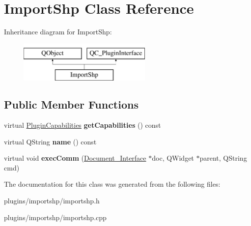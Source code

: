 \hypertarget{classImportShp}{\section{Import\-Shp Class Reference}
\label{classImportShp}
}
Inheritance diagram for Import\-Shp\-:\begin{figure}[H]
\begin{center}
\leavevmode
\includegraphics[height=2.000000cm]{classImportShp}
\end{center}
\end{figure}
\subsection*{Public Member Functions}
\begin{DoxyCompactItemize}
\item 
\hypertarget{classImportShp_ad975c3a17504764740128cd878c13ea3}{virtual \hyperlink{classPluginCapabilities}{Plugin\-Capabilities} {\bfseries get\-Capabilities} () const }\label{classImportShp_ad975c3a17504764740128cd878c13ea3}

\item 
\hypertarget{classImportShp_a21b6d29bbbcededcdb8bfde95039ec74}{virtual Q\-String {\bfseries name} () const }\label{classImportShp_a21b6d29bbbcededcdb8bfde95039ec74}

\item 
\hypertarget{classImportShp_a2da129d818162fdd52a45b79faf7da28}{virtual void {\bfseries exec\-Comm} (\hyperlink{classDocument__Interface}{Document\-\_\-\-Interface} $\ast$doc, Q\-Widget $\ast$parent, Q\-String cmd)}\label{classImportShp_a2da129d818162fdd52a45b79faf7da28}

\end{DoxyCompactItemize}


The documentation for this class was generated from the following files\-:\begin{DoxyCompactItemize}
\item 
plugins/importshp/importshp.\-h\item 
plugins/importshp/importshp.\-cpp\end{DoxyCompactItemize}
